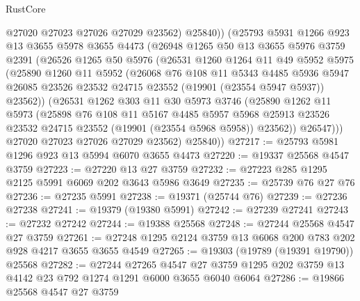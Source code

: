\begin{lexlean}{RustCore}
\begin{coremodule}
            @27020
            @27023
            @27026
            @27029
            @23562)
          @25840))
      (@25793
        @5931
        @1266
        @923
        @13
        @3655
        @5978
        @3655
        @4473
        (@26948
          @1265
          @50
          @13
          @3655
          @5976
          @3759
          @2391
          (@26526
            @1265
            @50
            @5976
            (@26531
              @1260
              @1264
              @11
              @49
              @5952
              @5975
              (@25890
                @1260
                @11
                @5952
                (@26068
                  @76
                  @108
                  @11
                  @5343
                  @4485
                  @5936
                  @5947
                  @26085
                  @23526
                  @23532
                  @24715
                  @23552
                  (@19901 (@23554 @5947 @5937))
                  @23562))
              (@26531
                @1262
                @303
                @11
                @30
                @5973
                @3746
                (@25890
                  @1262
                  @11
                  @5973
                  (@25898
                    @76
                    @108
                    @11
                    @5167
                    @4485
                    @5957
                    @5968
                    @25913
                    @23526
                    @23532
                    @24715
                    @23552
                    (@19901 (@23554 @5968 @5958))
                    @23562))
                @26547)))
          @27020
          @27023
          @27026
          @27029
          @23562)
        @25840))
@27217 := @25793 @5981 @1296 @923 @13 @5994 @6070 @3655 @4473
@27220 := @19337 @25568 @4547 @3759
@27223 := @27220 @13 @27 @3759
@27232 := @27223 @285 @1295 @2125 @5991 @6069 @202 @3643 @5986 @3649
@27235 := @25739 @76 @27 @76
@27236 := @27235 @5991
@27238 := @19371 (@25744 @76)
@27239 := @27236 @27238
@27241 := @19379 (@19380 @5991)
@27242 := @27239 @27241
@27243 := @27232 @27242
@27244 := @19388 @25568
@27248 := @27244 @25568 @4547 @27 @3759
@27261 := @27248 @1295 @2124 @3759 @13 @6068 @200 @783 @202 @928 @4217 @3655 @3655 @4549
@27265 := @19303 (@19789 (@19391 @19790)) @25568
@27282 := @27244
    @27265
    @4547
    @27
    @3759
    @1295
    @202
    @3759
    @13
    @4142
    @23
    @792
    @1274
    @1291
    @6000
    @3655
    @6040
    @6064
@27286 := @19866 @25568 @4547 @27 @3759

\end{coremodule}
\end{lexlean}
